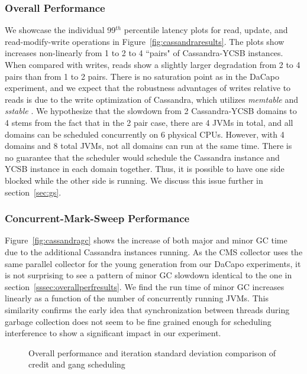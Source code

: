 \documentclass{sig-alternate}
\begin{document}
\subsubsection{Overall Performance}
We showcase the individual 99$^{th}$ percentile latency plots for read, update, and read-modify-write operations in Figure~\ref{fig:cassandraresults}. The plots show  increases non-linearly from 1 to 2 to 4 ``pairs" of Cassandra-YCSB instances. When compared with writes, reads show a slightly larger degradation from 2 to 4 pairs than from 1 to 2 pairs. There is no saturation point as in the DaCapo experiment, and we expect that the robustness advantages of writes relative to reads is due to the write optimization of Cassandra, which utilizes \textit{memtable} and \textit{sstable} \cite{lakshman2010cassandra}. We hypothesize that the slowdown from 2 Cassandra-YCSB domains to 4 stems from the fact that in the 2 pair case, there are 4 JVMs in total, and all domains can be scheduled concurrently on 6 physical CPUs. However, with 4 domains and 8 total JVMs, not all domains can run at the same time. There is no guarantee that the scheduler would schedule the Cassandra instance and YCSB instance in each domain together. Thus, it is possible to have one side blocked while the other side is running. We discuss this issue further in section~\ref{sec:gs}.

\subsubsection{Concurrent-Mark-Sweep Performance}
Figure~\ref{fig:cassandragc} shows the increase of both major and minor GC time due to the additional Cassandra instances running. As the CMS collector uses the same parallel collector for the young generation from our DaCapo experiments, it is not surprising to see a pattern of minor GC slowdown identical to the one in section~\ref{sssec:overallperfresults}. We find the run time of minor GC increases linearly as a function of the number of concurrently running JVMs. This similarity confirms the early idea that synchronization between threads during garbage collection does not seem to be fine grained enough for scheduling interference to show a significant impact in our experiment.

\begin{figure*}
\centering
{}
\caption{Overall performance and iteration standard deviation comparison of credit and gang scheduling}
\label{fig:gsresults}
\end{figure*}
\end{document}
